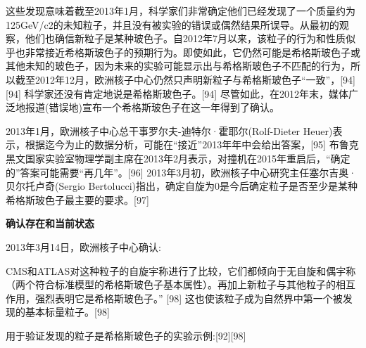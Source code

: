 这些发现意味着截至2013年1月，科学家们非常确定他们已经发现了一个质量约为125GeV/c2的未知粒子，并且没有被实验的错误或偶然结果所误导。从最初的观察，他们也确信新粒子是某种玻色子。自2012年7月以来，该粒子的行为和性质似乎也非常接近希格斯玻色子的预期行为。即使如此，它仍然可能是希格斯玻色子或其他未知的玻色子，因为未来的实验可能显示出与希格斯玻色子不匹配的行为，所以截至2012年12月，欧洲核子中心仍然只声明新粒子与希格斯玻色子“一致”，[94][94] 科学家还没有肯定地说是希格斯玻色子。[94] 尽管如此，在2012年末，媒体广泛地报道(错误地)宣布一个希格斯玻色子在这一年得到了确认。

2013年1月，欧洲核子中心总干事罗尔夫-迪特尔·霍耶尔(Rolf-Dieter Heuer)表示，根据迄今为止的数据分析，可能在“接近”2013年年中会给出答案，[95] 布鲁克黑文国家实验室物理学副主席在2013年2月表示，对撞机在2015年重启后，“确定的”答案可能需要“再几年”。[96] 2013年3月初，欧洲核子中心研究主任塞尔吉奥·贝尔托卢奇(Sergio Bertolucci)指出，确定自旋为0是今后确定粒子是否至少是某种希格斯玻色子最主要的要求。[97]

\textbf{确认存在和当前状态}

2013年3月14日，欧洲核子中心确认:

CMS和ATLAS对这种粒子的自旋宇称进行了比较，它们都倾向于无自旋和偶宇称（两个符合标准模型的希格斯玻色子基本属性）。再加上新粒子与其他粒子的相互作用，强烈表明它是希格斯玻色子。”  [98]
这也使该粒子成为自然界中第一个被发现的基本标量粒子。[98]

用于验证发现的粒子是希格斯玻色子的实验示例:[92][98]


